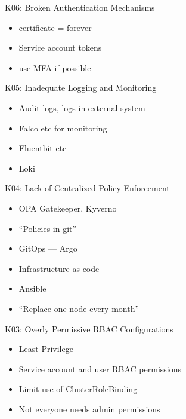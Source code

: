 \documentclass{dcpresentation}
\begin{document}
\begin{frame}{K06: Broken Authentication Mechanisms}
  \begin{itemize}
  \item certificate = forever
  \item Service account tokens
  \item use MFA if possible
  \end{itemize}
\end{frame}


\begin{frame}{K05: Inadequate Logging and Monitoring}
  \begin{itemize}
  \item Audit logs, logs in external system
  \item Falco etc for monitoring
  \item Fluentbit etc
  \item Loki
  \end{itemize}
\end{frame}

\begin{frame}{K04: Lack of Centralized Policy Enforcement}
  \begin{itemize}
  \item OPA Gatekeeper, Kyverno
  \item ``Policies in git''
  \end{itemize}
\end{frame}

\begin{frame}
  \begin{itemize}
  \item GitOps --- Argo
  \item Infrastructure as code
  \item Ansible
  \item ``Replace one node every month''
  \end{itemize}
\end{frame}


\begin{frame}{K03: Overly Permissive RBAC Configurations}
  \begin{itemize}
  \item Least Privilege
  \item Service account and user RBAC permissions
  \item Limit use of ClusterRoleBinding
  \item Not everyone needs admin permissions
  \end{itemize}
\end{frame}
\end{document}
